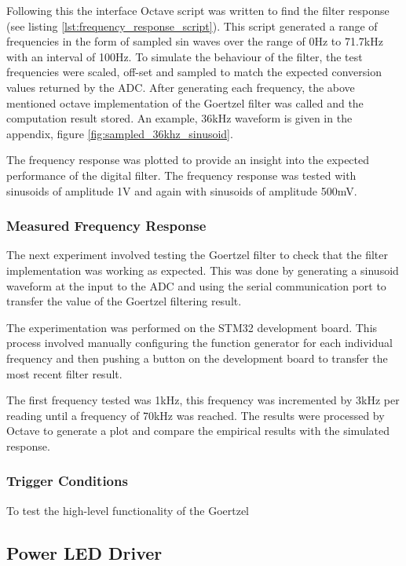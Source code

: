 Following this the interface Octave script was written to find the filter response (see listing \ref{lst:frequency_response_script}). This script generated a range of frequencies in the form of sampled sin waves over the range of 0Hz to 71.7kHz with an interval of 100Hz. To simulate the behaviour of the filter, the test frequencies were scaled, off-set and sampled to match the expected conversion values returned by the ADC. After generating each frequency, the above mentioned octave implementation of the Goertzel filter was called and the computation result stored. An example, 36kHz waveform is given in the appendix, figure \ref{fig:sampled_36khz_sinusoid}.

The frequency response was plotted to provide an insight into the expected performance of the digital filter. The frequency response was tested with sinusoids of amplitude 1V and again with sinusoids of amplitude 500mV.

\subsubsection{Measured Frequency Response}
The next experiment involved testing the Goertzel filter to check that the filter implementation was working as expected. This was done by generating a sinusoid waveform at the input to the ADC and using the serial communication port to transfer the value of the Goertzel filtering result. 

The experimentation was performed on the STM32 development board. This process involved manually configuring the function generator for each individual frequency and then pushing a button on the development board to transfer the most recent filter result.

The first frequency tested was 1kHz, this frequency was incremented by 3kHz per reading until a frequency of 70kHz was reached. The results were processed by Octave to generate a plot and compare the empirical results with the simulated response.


\subsubsection{Trigger Conditions}
To test the high-level functionality of the Goertzel




\subsection{Power LED Driver}

